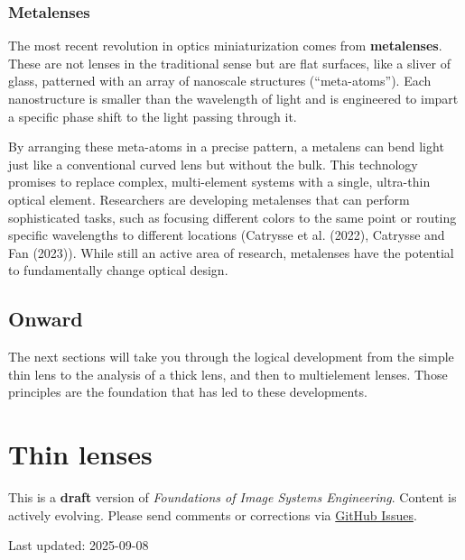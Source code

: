 \documentclass[
  letterpaper,
]{book}
\begin{document}
\subsection{Metalenses}\label{metalenses}

The most recent revolution in optics miniaturization comes from
\textbf{metalenses}. These are not lenses in the traditional sense but
are flat surfaces, like a sliver of glass, patterned with an array of
nanoscale structures (``meta-atoms''). Each nanostructure is smaller
than the wavelength of light and is engineered to impart a specific
phase shift to the light passing through it.

By arranging these meta-atoms in a precise pattern, a metalens can bend
light just like a conventional curved lens but without the bulk. This
technology promises to replace complex, multi-element systems with a
single, ultra-thin optical element. Researchers are developing
metalenses that can perform sophisticated tasks, such as focusing
different colors to the same point or routing specific wavelengths to
different locations (Catrysse et al. (2022), Catrysse and Fan (2023)).
While still an active area of research, metalenses have the potential to
fundamentally change optical design.

\section{Onward}\label{onward}

The next sections will take you through the logical development from the
simple thin lens to the analysis of a thick lens, and then to
multielement lenses. Those principles are the foundation that has led to
these developments.

\chapter{Thin lenses}\label{sec-optics-thinlens}

\begin{tcolorbox}[enhanced jigsaw, colframe=quarto-callout-warning-color-frame, titlerule=0mm, rightrule=.15mm, opacitybacktitle=0.6, colback=white, leftrule=.75mm, coltitle=black, title=\textcolor{quarto-callout-warning-color}{\faExclamationTriangle}\hspace{0.5em}{Work in Progress}, bottomrule=.15mm, colbacktitle=quarto-callout-warning-color!10!white, breakable, left=2mm, bottomtitle=1mm, toptitle=1mm, opacityback=0, arc=.35mm, toprule=.15mm]

This is a \textbf{draft} version of \emph{Foundations of Image Systems
Engineering}. Content is actively evolving. Please send comments or
corrections via \href{https://github.com/wandell/FISE-git/issues}{GitHub
Issues}.

Last updated: 2025-09-08

\end{tcolorbox}
\end{document}
